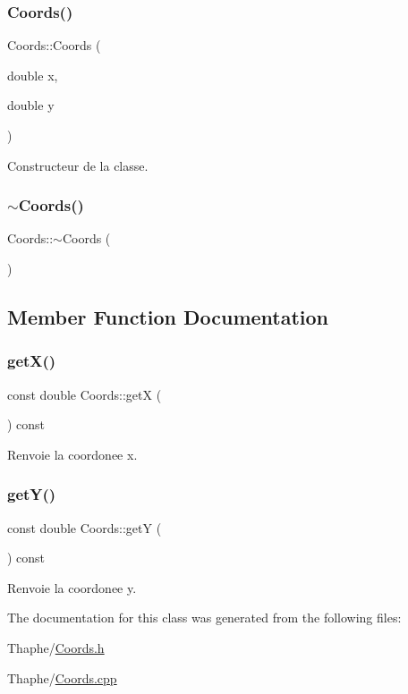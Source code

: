 \subsubsection{\texorpdfstring{Coords()}{Coords()}}
{\footnotesize\ttfamily Coords\+::\+Coords (\begin{DoxyParamCaption}\item[{double}]{x,  }\item[{double}]{y }\end{DoxyParamCaption})}



Constructeur de la classe. 

\mbox{\label{class_coords_a475cfe7279f33a807a682d6fccb529dc}} 
\subsubsection{\texorpdfstring{$\sim$Coords()}{~Coords()}}
{\footnotesize\ttfamily Coords\+::$\sim$\+Coords (\begin{DoxyParamCaption}{ }\end{DoxyParamCaption})}



\subsection{Member Function Documentation}
\mbox{\label{class_coords_ace1df844690c765993d4aab4444dc3bb}} 
\subsubsection{\texorpdfstring{getX()}{getX()}}
{\footnotesize\ttfamily const double Coords\+::getX (\begin{DoxyParamCaption}{ }\end{DoxyParamCaption}) const}



Renvoie la coordonee x. 

\mbox{\label{class_coords_a97ee10f1880dca8a6139ab69e822d26f}} 
\subsubsection{\texorpdfstring{getY()}{getY()}}
{\footnotesize\ttfamily const double Coords\+::getY (\begin{DoxyParamCaption}{ }\end{DoxyParamCaption}) const}



Renvoie la coordonee y. 



The documentation for this class was generated from the following files\+:\begin{DoxyCompactItemize}
\item 
Thaphe/\mbox{\hyperlink{_coords_8h}{Coords.\+h}}\item 
Thaphe/\mbox{\hyperlink{_coords_8cpp}{Coords.\+cpp}}\end{DoxyCompactItemize}
